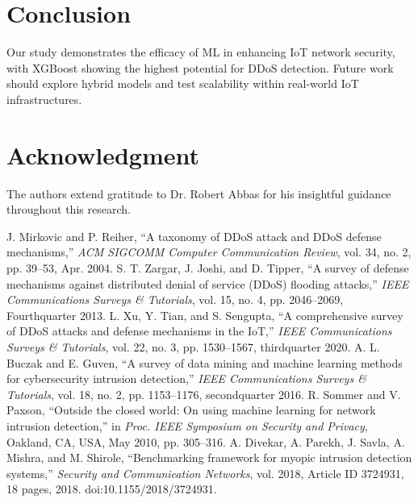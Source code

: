 \documentclass[conference]{IEEEtran}
\begin{document}
\section{Conclusion}
Our study demonstrates the efficacy of ML in enhancing IoT network security, with XGBoost showing the highest potential for DDoS detection. Future work should explore hybrid models and test scalability within real-world IoT infrastructures.

\section*{Acknowledgment}
The authors extend gratitude to Dr. Robert Abbas for his insightful guidance throughout this research.

\begin{thebibliography}{00}
 J. Mirkovic and P. Reiher, ``A taxonomy of DDoS attack and DDoS defense mechanisms,'' \emph{ACM SIGCOMM Computer Communication Review}, vol. 34, no. 2, pp. 39--53, Apr. 2004.
 S. T. Zargar, J. Joshi, and D. Tipper, ``A survey of defense mechanisms against distributed denial of service (DDoS) flooding attacks,'' \emph{IEEE Communications Surveys \& Tutorials}, vol. 15, no. 4, pp. 2046--2069, Fourthquarter 2013.
 L. Xu, Y. Tian, and S. Sengupta, ``A comprehensive survey of DDoS attacks and defense mechanisms in the IoT,'' \emph{IEEE Communications Surveys \& Tutorials}, vol. 22, no. 3, pp. 1530--1567, thirdquarter 2020.
 A. L. Buczak and E. Guven, ``A survey of data mining and machine learning methods for cybersecurity intrusion detection,'' \emph{IEEE Communications Surveys \& Tutorials}, vol. 18, no. 2, pp. 1153--1176, secondquarter 2016.
 R. Sommer and V. Paxson, ``Outside the closed world: On using machine learning for network intrusion detection,'' in \emph{Proc. IEEE Symposium on Security and Privacy}, Oakland, CA, USA, May 2010, pp. 305--316.
 A. Divekar, A. Parekh, J. Savla, A. Mishra, and M. Shirole, ``Benchmarking framework for myopic intrusion detection systems,'' \emph{Security and Communication Networks}, vol. 2018, Article ID 3724931, 18 pages, 2018. doi:10.1155/2018/3724931.
\end{thebibliography}
\end{document}
